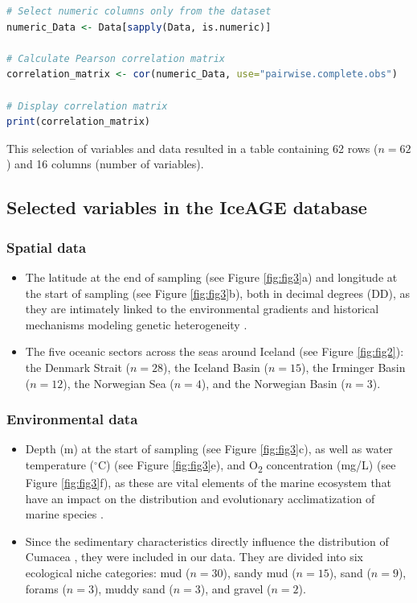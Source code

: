 {\begin{lstlisting}[label=lst:pearson,language=R,caption=RStudio script to calculate the Pearson correlation coefficient between all the numerical variables in our final dataset.]
# Select numeric columns only from the dataset
numeric_Data <- Data[sapply(Data, is.numeric)]

# Calculate Pearson correlation matrix
correlation_matrix <- cor(numeric_Data, use="pairwise.complete.obs")

# Display correlation matrix
print(correlation_matrix)
\end{lstlisting}

This selection of variables and data resulted in a table containing 62 rows ($n=62$) and 16 columns (number of variables).

\subsection{Selected variables in the IceAGE database}
\subsubsection{Spatial data}
\begin{itemize}
\item The latitude at the end of sampling (see Figure \ref{fig:fig3}a) and longitude at the start of sampling (see Figure \ref{fig:fig3}b), both in decimal degrees (DD), as they are intimately linked to the environmental gradients and historical mechanisms modeling genetic heterogeneity \citep{gaither2013origins}.
\item The five oceanic sectors across the seas around Iceland (see Figure \ref{fig:fig2}): the Denmark Strait ($n=28$), the Iceland Basin ($n=15$), the Irminger Basin ($n=12$), the Norwegian Sea ($n=4$), and the Norwegian Basin ($n=3$).
\end{itemize}

\subsubsection{Environmental data}
\begin{itemize}
\item Depth (m) at the start of sampling (see Figure \ref{fig:fig3}c), as well as water temperature ($^\circ$C) (see Figure \ref{fig:fig3}e), and O\textsubscript{2} concentration (mg/L) (see Figure \ref{fig:fig3}f), as these are vital elements of the marine ecosystem that have an impact on the distribution and evolutionary acclimatization of marine species \citep{rex2006global, danovaro2010first}.
\item Since the sedimentary characteristics directly influence the distribution of Cumacea \citep{uhlir_adding_2021}, they were included in our data. They are divided into six ecological niche categories: mud ($n=30$), sandy mud ($n=15$), sand ($n=9$), forams ($n=3$), muddy sand ($n=3$), and gravel ($n=2$).
\end{itemize}

}
